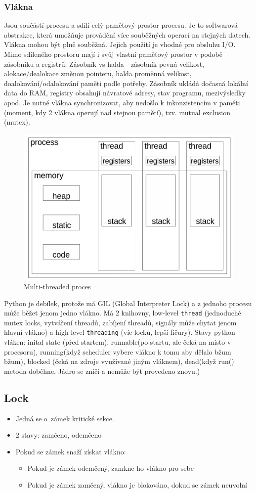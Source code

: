 \subsubsection{Vlákna}
Jsou součástí procesu a sdílí celý paměťový prostor procesu. Je to softwarová abstrakce, která umožňuje provádění více souběžných operací na stejných datech. Vlákna mohou být plně souběžná. 
Jejich použití je vhodné pro obsluhu I/O. Mimo sdíleného prostoru mají i svůj vlastní paměťový prostor v podobě zásobníku a registrů. Zásobník vs halda - zásobník pevná velikost, alokace/dealokace změnou pointeru, halda proměnná velikost, doalokování/odalokování paměti podle potřeby. Zásobník ukládá dočasná lokální data do RAM, registry obsahují návratové adresy, stav programu, mezivýsledky apod. Je nutné vlákna synchronizovat, aby nedošlo k inkonzistencím v paměti (moment, kdy 2 vlákna operují nad stejnou pamětí), tzv. mutual exclusion (mutex).
\begin{figure}[ht]
    \centering
    \includegraphics[width=0.5\linewidth]{pict/multithread.png}
    \caption{Multi-threaded proces}
\end{figure}

Python je debílek, protože má GIL (Global Interpreter Lock) a z jednoho procesu může běžet jenom jedno vlákno. Má 2 knihovny, low-level \texttt{thread} (jednoduché mutex locks, vytváření threadů, zabíjení threadů, signály může chytat jenom hlavní vlákno) a high-level \texttt{threading} (víc locků, lepší fíčury). Stavy python vláken: inital state (před startem), runnable(po startu, ale čeká na místo v procesoru), running(když scheduler vybere vlákno k tomu aby dělalo bžum bžum), blocked (čeká na zdroje využívané jiným vláknem), dead(když run() metoda doběhne. Jádro se zničí a nemůže být provedeno znovu.)

\subsection{Lock}
\begin{itemize}
    \item Jedná se o~zámek kritické sekce. 
    \item 2 stavy: zamčeno, odemčeno
    \item Pokud se zámek snaží získat vlákno:
    \begin{itemize}
        \item Pokud je zámek odemčený, zamkne ho vlákno pro sebe
        \item Pokud je zámek zamčený, vlákno je blokováno, dokud se zámek neuvolní
    \end{itemize}
\end{itemize}

